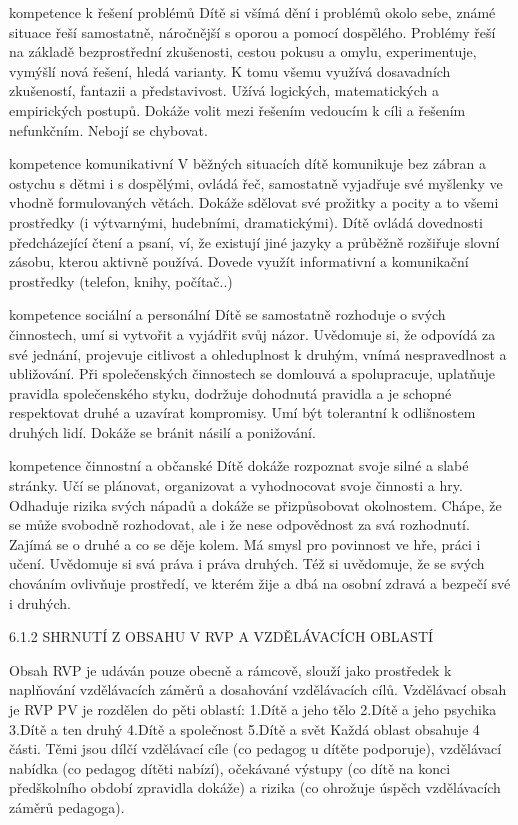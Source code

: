 	kompetence k řešení problémů
	Dítě si všímá dění i problémů okolo sebe, známé situace řeší samostatně, náročnější s oporou a pomocí dospělého. Problémy řeší na základě bezprostřední zkušenosti, cestou pokusu a omylu, experimentuje, vymýšlí nová řešení, hledá varianty. K tomu všemu využívá dosavadních zkušeností, fantazii a představivost. Užívá logických, matematických a empirických postupů. Dokáže volit mezi řešením vedoucím k cíli a řešením nefunkčním. Nebojí se chybovat.

	kompetence komunikativní
	V běžných situacích dítě komunikuje bez zábran a ostychu s dětmi i s dospělými, ovládá řeč, samostatně vyjadřuje své myšlenky ve vhodně formulovaných větách. Dokáže sdělovat své prožitky a pocity a to všemi prostředky (i výtvarnými, hudebními, dramatickými). Dítě ovládá dovednosti předcházející čtení a psaní, ví, že existují jiné jazyky a průběžně rozšiřuje slovní zásobu, kterou aktivně používá. Dovede využít informativní a komunikační prostředky (telefon, knihy, počítač..)

	kompetence sociální a personální
	Dítě se samostatně rozhoduje o svých činnostech, umí si vytvořit a vyjádřit svůj názor. Uvědomuje si, že odpovídá za své jednání, projevuje citlivost a ohleduplnost k druhým, vnímá nespravedlnost a ubližování. Při společenských činnostech se domlouvá a spolupracuje, uplatňuje pravidla společenského styku, dodržuje dohodnutá pravidla a je schopné respektovat druhé a uzavírat kompromisy. Umí být tolerantní k odlišnostem druhých lidí. Dokáže se bránit násilí a ponižování.

	kompetence činnostní a občanské
	Dítě dokáže rozpoznat svoje silné a slabé stránky. Učí se plánovat, organizovat a vyhodnocovat svoje činnosti a hry. Odhaduje rizika svých nápadů a dokáže se přizpůsobovat okolnostem. Chápe, že se může svobodně rozhodovat, ale i že nese odpovědnost za svá rozhodnutí. Zajímá se o druhé a co se děje kolem. Má smysl pro povinnost ve hře, práci i učení. Uvědomuje si svá práva i práva druhých. Též si uvědomuje, že se svých chováním ovlivňuje prostředí, ve kterém žije a dbá na osobní zdravá a bezpečí své i druhých. 

	6.1.2 SHRNUTÍ Z OBSAHU V RVP A VZDĚLÁVACÍCH OBLASTÍ

	Obsah RVP je udáván pouze obecně a rámcově, slouží jako prostředek k naplňování
	vzdělávacích záměrů a dosahování vzdělávacích cílů. Vzdělávací obsah je RVP PV je rozdělen do pěti oblastí:
	1.Dítě a jeho tělo
	2.Dítě a jeho psychika
	 3.Dítě a ten druhý
	 4.Dítě a společnost
	 5.Dítě a svět
	Každá oblast obsahuje 4 části. Těmi jsou dílčí vzdělávací cíle (co pedagog u dítěte podporuje), vzdělávací nabídka (co pedagog dítěti nabízí), očekávané výstupy (co dítě na konci předškolního období zpravidla dokáže) a rizika (co ohrožuje úspěch vzdělávacích záměrů pedagoga).


